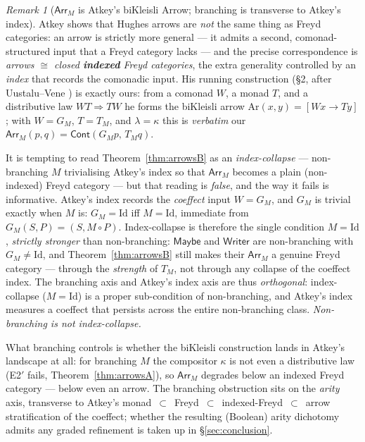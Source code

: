 \documentclass[11pt]{amsart}
\theoremstyle{plain}
\theoremstyle{definition}
\theoremstyle{remark}
\newtheorem{remark}[theorem]{Remark}
\newcommand{\Cont}{\mathsf{Cont}}
\newcommand{\cont}[2]{(#1,#2)}
\newcommand{\Maybe}{\mathsf{Maybe}}
\newcommand{\Writer}{\mathsf{Writer}}
\newcommand{\Arr}{\mathsf{Arr}}
\begin{document}
\begin{remark}[$\Arr_M$ is Atkey's biKleisli Arrow; branching is transverse to Atkey's index]\label{rem:atkey}
Atkey \cite{Atkey11} shows that Hughes arrows are \emph{not} the same thing as Freyd
categories: an arrow is strictly more general --- it admits a second, comonad-structured
input that a Freyd category lacks --- and the precise correspondence is \emph{arrows $\cong$
closed \textbf{indexed} Freyd categories}, the extra generality controlled by an \emph{index}
that records the comonadic input. His running construction (\S2, after Uustalu--Vene
\cite{UustaluVene08}) is exactly ours: from a comonad $W$, a monad $T$, and a distributive
law $WT\Rightarrow TW$ he forms the biKleisli arrow $\mathrm{Ar}(x,y)=[Wx\to Ty]$; with
$W=G_M$, $T=T_M$, and $\lambda=\kappa$ this is \emph{verbatim} our
$\Arr_M(p,q)=\Cont(G_M p,\,T_M q)$.

It is tempting to read Theorem~\ref{thm:arrowsB} as an \emph{index-collapse} --- non-branching
$M$ trivialising Atkey's index so that $\Arr_M$ becomes a plain (non-indexed) Freyd category
--- but that reading is \emph{false}, and the way it fails is informative. Atkey's index
records the \emph{coeffect} input $W=G_M$, and $G_M$ is trivial exactly when $M$ is:
$G_M=\mathrm{Id}$ iff $M=\mathrm{Id}$, immediate from $G_M\cont S P=\cont S{M\circ P}$.
Index-collapse is therefore the single condition $M=\mathrm{Id}$, \emph{strictly stronger}
than non-branching: $\Maybe$ and $\Writer$ are non-branching with $G_M\neq\mathrm{Id}$, and
Theorem~\ref{thm:arrowsB} still makes their $\Arr_M$ a genuine Freyd category --- through the
\emph{strength} of $T_M$, not through any collapse of the coeffect index. The branching axis
and Atkey's index axis are thus \emph{orthogonal}: index-collapse ($M=\mathrm{Id}$) is a proper
sub-condition of non-branching, and Atkey's index measures a coeffect that persists across the
entire non-branching class. \emph{Non-branching is not index-collapse.}

What branching controls is whether the biKleisli construction lands in Atkey's landscape at
all: for branching $M$ the compositor $\kappa$ is not even a distributive law (E2$'$ fails,
Theorem~\ref{thm:arrowsA}), so $\Arr_M$ degrades below an indexed Freyd category --- below even
an arrow. The branching obstruction sits on the \emph{arity} axis, transverse to Atkey's
monad~$\subset$~Freyd~$\subset$~indexed-Freyd~$\subset$~arrow stratification of the coeffect;
whether the resulting (Boolean) arity dichotomy admits any graded refinement is taken up in
\S\ref{sec:conclusion}.
\end{remark}
\end{document}
